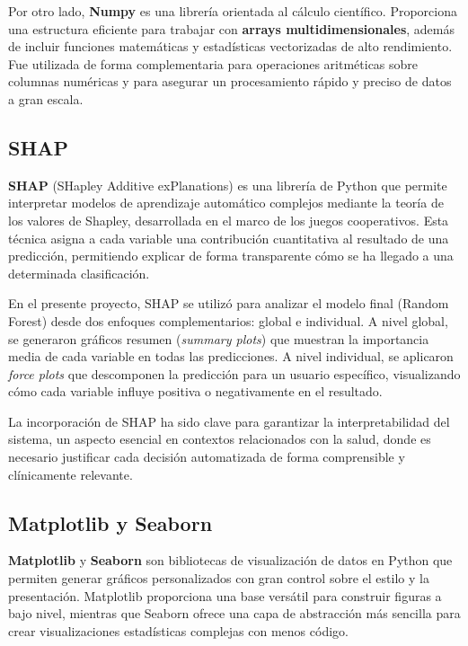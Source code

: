 Por otro lado, \textbf{Numpy} es una librería orientada al cálculo científico. Proporciona una estructura eficiente para trabajar con \textbf{arrays multidimensionales}, además de incluir funciones matemáticas y estadísticas vectorizadas de alto rendimiento. Fue utilizada de forma complementaria para operaciones aritméticas sobre columnas numéricas y para asegurar un procesamiento rápido y preciso de datos a gran escala.

\subsection{SHAP}

\textbf{SHAP} (SHapley Additive exPlanations) es una librería de Python que permite interpretar modelos de aprendizaje automático complejos mediante la teoría de los valores de Shapley, desarrollada en el marco de los juegos cooperativos. Esta técnica asigna a cada variable una contribución cuantitativa al resultado de una predicción, permitiendo explicar de forma transparente cómo se ha llegado a una determinada clasificación.

En el presente proyecto, SHAP se utilizó para analizar el modelo final (Random Forest) desde dos enfoques complementarios: global e individual. A nivel global, se generaron gráficos resumen (\textit{summary plots}) que muestran la importancia media de cada variable en todas las predicciones. A nivel individual, se aplicaron \textit{force plots} que descomponen la predicción para un usuario específico, visualizando cómo cada variable influye positiva o negativamente en el resultado.

La incorporación de SHAP ha sido clave para garantizar la interpretabilidad del sistema, un aspecto esencial en contextos relacionados con la salud, donde es necesario justificar cada decisión automatizada de forma comprensible y clínicamente relevante.

\subsection{Matplotlib y Seaborn}

\textbf{Matplotlib} y \textbf{Seaborn} son bibliotecas de visualización de datos en Python que permiten generar gráficos personalizados con gran control sobre el estilo y la presentación. Matplotlib proporciona una base versátil para construir figuras a bajo nivel, mientras que Seaborn ofrece una capa de abstracción más sencilla para crear visualizaciones estadísticas complejas con menos código.

